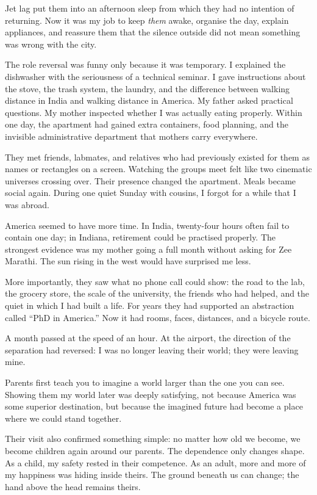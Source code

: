 \documentclass[11pt,twoside,openany]{book}
\newcommand{\scene}{\par\vspace{0.7em}{\centering\color{accent}\rule{0.85cm}{0.6pt}\par}\vspace{0.5em}\noindent\ignorespaces}
\begin{document}
\scene

Jet lag put them into an afternoon sleep from which they had no intention of
returning. Now it was my job to keep \textit{them} awake, organise the day,
explain appliances, and reassure them that the silence outside did not mean
something was wrong with the city.

The role reversal was funny only because it was temporary. I explained the
dishwasher with the seriousness of a technical seminar. I gave instructions
about the stove, the trash system, the laundry, and the difference between
walking distance in India and walking distance in America. My father asked
practical questions. My mother inspected whether I was actually eating
properly. Within one day, the apartment had gained extra containers, food
planning, and the invisible administrative department that mothers carry
everywhere.

They met friends, labmates, and relatives who had previously existed for them
as names or rectangles on a screen. Watching the groups meet felt like two
cinematic universes crossing over. Their presence changed the apartment.
Meals became social again. During one quiet Sunday with cousins, I forgot for
a while that I was abroad.

America seemed to have more time. In India, twenty-four hours often fail to
contain one day; in Indiana, retirement could be practised properly. The
strongest evidence was my mother going a full month without asking for Zee
Marathi. The sun rising in the west would have surprised me less.

More importantly, they saw what no phone call could show: the road to the lab,
the grocery store, the scale of the university, the friends who had helped,
and the quiet in which I had built a life. For years they had supported an
abstraction called ``PhD in America.'' Now it had rooms, faces, distances, and
a bicycle route.

\scene

A month passed at the speed of an hour. At the airport, the direction of the
separation had reversed: I was no longer leaving their world; they were
leaving mine.

Parents first teach you to imagine a world larger than the one you can see.
Showing them my world later was deeply satisfying, not because America was
some superior destination, but because the imagined future had become a place
where we could stand together.

Their visit also confirmed something simple: no matter how old we become, we
become children again around our parents. The dependence only changes shape.
As a child, my safety rested in their competence. As an adult, more and more
of my happiness was hiding inside theirs. The ground beneath us can change;
the hand above the head remains theirs.
\end{document}
